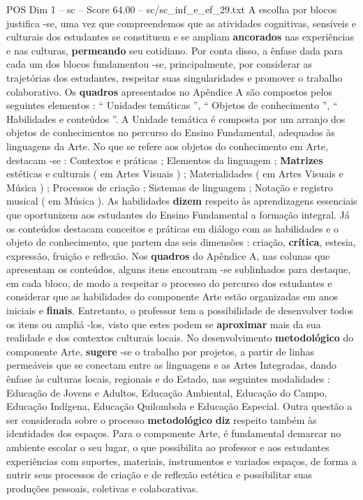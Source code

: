 \begin{textsample}{POS Dim 1 – sc – Score 64.00 – sc/sc\_inf\_e\_ef\_29.txt}
A escolha por blocos justifica -se, uma vez que compreendemos que as atividades cognitivas, sensíveis e culturais dos estudantes se constituem e se ampliam \textbf{ancorados} nas experiências e nas culturas, \textbf{permeando} seu cotidiano.
Por conta disso, a ênfase dada para cada um dos blocos fundamentou -se, principalmente, por considerar as trajetórias dos estudantes, respeitar suas singularidades e promover o trabalho colaborativo.
Os \textbf{quadros} apresentados no Apêndice A são compostos pelos seguintes elementos : “ Unidades temáticas ”, “ Objetos de conhecimento ”, “ Habilidades e conteúdos ”.
A Unidade temática é composta por um arranjo dos objetos de conhecimentos no percurso do Ensino Fundamental, adequados às linguagens da Arte.
No que se refere aos objetos do conhecimento em Arte, destacam -se : Contextos e práticas ; Elementos da linguagem ; \textbf{Matrizes} estéticas e culturais ( em Artes Visuais ) ; Materialidades ( em Artes Visuais e Música ) ; Processos de criação ; Sistemas de linguagem ; Notação e registro musical ( em Música ).
As habilidades \textbf{dizem} respeito às aprendizagens essenciais que oportunizem aos estudantes do Ensino Fundamental a formação integral.
Já os conteúdos destacam conceitos e práticas em diálogo com as habilidades e o objeto de conhecimento, que partem das seis dimensões : criação, \textbf{crítica}, estesia, expressão, fruição e reflexão.
Nos \textbf{quadros} do Apêndice A, nas colunas que apresentam os conteúdos, alguns itens encontram -se sublinhados para destaque, em cada bloco, de modo a respeitar o processo do percurso dos estudantes e considerar que as habilidades do componente Arte estão organizadas em anos iniciais e \textbf{finais}.
Entretanto, o professor tem a possibilidade de desenvolver todos os itens ou ampliá -los, visto que estes podem se \textbf{aproximar} mais da sua realidade e dos contextos culturais locais.
No desenvolvimento \textbf{metodológico} do componente Arte, \textbf{sugere} -se o trabalho por projetos, a partir de linhas permeáveis que se conectam entre as linguagens e as Artes Integradas, dando ênfase às culturas locais, regionais e do Estado, nas seguintes modalidades : Educação de Jovens e Adultos, Educação Ambiental, Educação do Campo, Educação Indígena, Educação Quilombola e Educação Especial.
Outra questão a ser considerada sobre o processo \textbf{metodológico} \textbf{diz} respeito também às identidades dos espaços.
Para o componente Arte, é fundamental demarcar no ambiente escolar o seu lugar, o que possibilita ao professor e aos estudantes experiências com suportes, materiais, instrumentos e variados espaços, de forma a nutrir seus processos de criação e de reflexão estética e possibilitar suas produções pessoais, coletivas e colaborativas.

\end{textsample}
